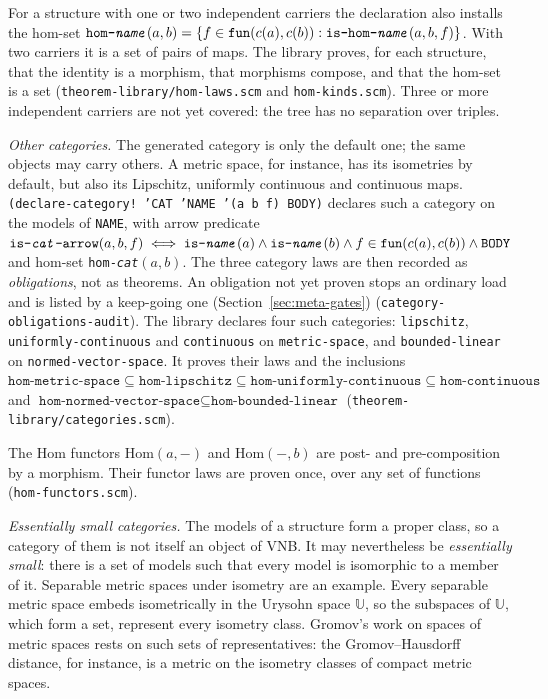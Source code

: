 \begin{itemize}
  For a structure with one or two independent carriers the declaration also
  installs the hom-set
  $\texttt{hom-\textit{name}}(a, b) = \{f \in \mathtt{fun}(c(a), c(b)) : \texttt{is-hom-\textit{name}}(a, b, f)\}$.
  With two carriers it is a set of pairs of maps.  The library proves, for
  each structure, that the identity is a morphism, that morphisms compose,
  and that the hom-set is a set (\texttt{theorem-library/hom-laws.scm} and
  \texttt{hom-kinds.scm}).  Three or more independent carriers are not yet
  covered: the tree has no separation over triples.

  \emph{Other categories.}  The generated category is only the default one;
  the same objects may carry others.  A metric space, for instance, has its
  isometries by default, but also its Lipschitz, uniformly continuous and
  continuous maps.  \texttt{(declare-category! 'CAT 'NAME '(a b f) BODY)}
  declares such a category on the models of \texttt{NAME}, with arrow
  predicate
  $\texttt{is-\textit{cat}-arrow}(a, b, f) \iff \texttt{is-\textit{name}}(a) \wedge \texttt{is-\textit{name}}(b) \wedge f \in \mathtt{fun}(c(a), c(b)) \wedge \mathtt{BODY}$
  and hom-set \texttt{hom-\textit{cat}}$(a, b)$.  The three category laws are
  then recorded as \emph{obligations}, not as theorems.  An obligation not yet
  proven stops an ordinary load and is listed by a keep-going one
  (Section~\ref{sec:meta-gates})
  (\texttt{category-obligations-audit}).  The library declares four such
  categories: \texttt{lipschitz}, \texttt{uniformly-continuous} and
  \texttt{continuous} on \texttt{metric-space}, and \texttt{bounded-linear} on
  \texttt{normed-vector-space}.  It proves their laws and the inclusions
  $\texttt{hom-metric-space} \subseteq \texttt{hom-lipschitz} \subseteq \texttt{hom-uniformly-continuous} \subseteq \texttt{hom-continuous}$
  and $\texttt{hom-normed-vector-space} \subseteq \texttt{hom-bounded-linear}$
  (\texttt{theorem-library/categories.scm}).

  The Hom functors $\mathrm{Hom}(a, -)$ and $\mathrm{Hom}(-, b)$ are post- and
  pre-composition by a morphism.  Their functor laws are proven once, over any
  set of functions (\texttt{hom-functors.scm}).

  \emph{Essentially small categories.}  The models of a structure form a
  proper class, so a category of them is not itself an object of VNB.  It
  may nevertheless be \emph{essentially small}: there is a set of models
  such that every model is isomorphic to a member of it.  Separable metric spaces under isometry
  are an example.  Every separable metric space embeds isometrically in the
  Urysohn space $\mathbb{U}$, so the subspaces of $\mathbb{U}$, which form a
  set, represent every isometry class.  Gromov's work on spaces of metric
  spaces rests on such sets of representatives: the Gromov--Hausdorff
  distance, for instance, is a metric on the isometry classes of compact
  metric spaces.


\end{itemize}
